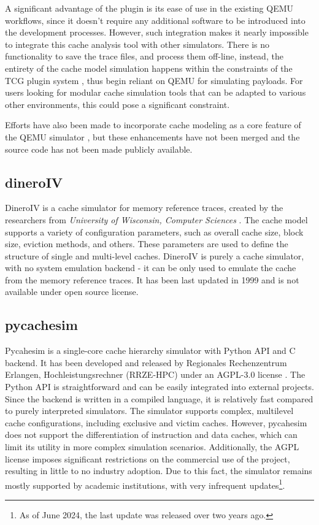 A significant advantage of the plugin is its ease of use in the existing QEMU workflows, since it doesn't require any additional software to be introduced into the development processes.
However, such integration makes it nearly impossible to integrate this cache analysis tool with other simulators. There is no functionality to save the trace files, and process them off-line,
instead, the entirety of the cache model simulation happens within the constraints of the TCG plugin system \cite{qemutcgplugindocs}, thus begin reliant on QEMU for simulating 
payloads. For users looking for modular cache simulation tools that can be adapted to various other environments, this could pose a significant constraint.

\vspace{10px}
\noindent Efforts have also been made to incorporate cache modeling as a core feature of the QEMU simulator \cite{qemucacheattempt}, but these enhancements have not been merged and the
source code has not been made publicly available.

\subsection{dineroIV}

DineroIV is a cache simulator for memory reference traces, created by the researchers from \textit{University of Wisconsin, Computer Sciences} \cite{dinero}. 
The cache model supports a variety of configuration parameters, such as overall cache size, block size, eviction methods, and others. These parameters are used to define the structure of
single and multi-level caches. DineroIV is purely a cache simulator, with no system emulation backend - it can be only used to emulate the cache from the memory reference traces.
It has been last updated in 1999 and is not available under open source license.

\subsection{pycachesim}

Pycahesim is a single-core cache hierarchy simulator with Python API and C backend. It has been developed and released by Regionales Rechenzentrum Erlangen, Hochleistungsrechner (RRZE-HPC)
under an AGPL-3.0 license \cite{pycachesim}. The Python API is straightforward and can be easily integrated into external projects. Since the backend is written in a compiled language, it is
relatively fast compared to purely interpreted simulators. The simulator supports complex, multilevel cache configurations, including exclusive and victim caches.
However, pycahesim does not support the differentiation of instruction and data caches, which can limit its utility in more complex simulation scenarios. Additionally, the AGPL
license imposes significant restrictions on the commercial use of the project, resulting in little to no industry adoption. Due to this fact, the simulator remains mostly supported
by academic institutions, with very infrequent updates\footnote{As of June 2024, the last update was released over two years ago.}.

